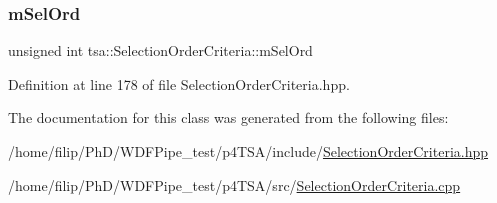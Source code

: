\subsubsection{\texorpdfstring{m\+Sel\+Ord}{mSelOrd}}
{\footnotesize\ttfamily unsigned int tsa\+::\+Selection\+Order\+Criteria\+::m\+Sel\+Ord\hspace{0.3cm}{\ttfamily [private]}}



Definition at line 178 of file Selection\+Order\+Criteria.\+hpp.



The documentation for this class was generated from the following files\+:\begin{DoxyCompactItemize}
\item 
/home/filip/\+Ph\+D/\+W\+D\+F\+Pipe\+\_\+test/p4\+T\+S\+A/include/\hyperlink{_selection_order_criteria_8hpp}{Selection\+Order\+Criteria.\+hpp}\item 
/home/filip/\+Ph\+D/\+W\+D\+F\+Pipe\+\_\+test/p4\+T\+S\+A/src/\hyperlink{_selection_order_criteria_8cpp}{Selection\+Order\+Criteria.\+cpp}\end{DoxyCompactItemize}
